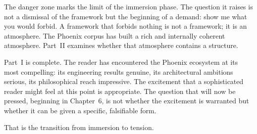 The danger zone marks the limit of the immersion phase.
The question it raises is not a dismissal of the framework
but the beginning of a demand: show me what you would
forbid. A framework that forbids nothing is not a framework;
it is an atmosphere. The Phoenix corpus has built a rich
and internally coherent atmosphere. Part~II examines whether
that atmosphere contains a structure.

\medskip

Part~I is complete. The reader has encountered the Phoenix
ecosystem at its most compelling: its engineering results
genuine, its architectural ambitions serious, its philosophical
reach impressive. The excitement that a sophisticated reader
might feel at this point is appropriate. The question that
will now be pressed, beginning in Chapter~6, is not whether
the excitement is warranted but whether it can be given a
specific, falsifiable form.

That is the transition from immersion to tension.
